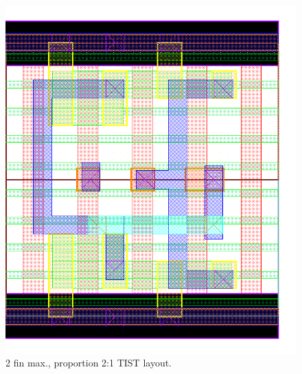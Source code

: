 \documentclass[pgmicro,mestrado,english]{iiufrgs}
\begin{document}
\begin{figure}[]
\centering
\includegraphics[width=\textwidth,height=\textheight,keepaspectratio]{TIST2F1F.png}
\caption{2 fin max., proportion 2:1 TIST layout.}
\label{fig:TIST1F}
\end{figure}
\end{document}
